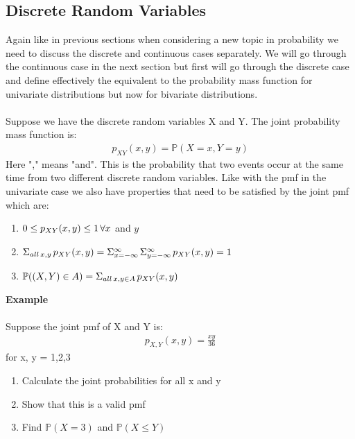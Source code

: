\documentclass[,oneside]{article}
\begin{document}
\begin{enumerate}
\subsection{Discrete Random Variables}
Again like in previous sections when considering a new topic in probability we need to discuss the discrete and continuous cases separately. We will go through the continuous case in the next section but first will go through the discrete case and define effectively the equivalent to the probability mass function for univariate distributions but now for bivariate distributions. \\ \\
Suppose we have the discrete random variables X and Y. The joint probability mass function is:
\begin{align*}
p_{XY}(x,y) = \mathbb{P}(X = x, Y = y)
\end{align*}
Here "," means "and". This is the probability that two events occur at the same time from two different discrete random variables. Like with the pmf in the univariate case we also have properties that need to be satisfied by the joint pmf which are:
\begin{enumerate}
\item $0 \leq p_{XY}(x,y) \leq 1\hspace{0.05cm}\forall x$ and $y$
\item $\Sigma_{all \hspace{0.05cm}x,y}\hspace{0.05cm} p_{XY}(x,y) = \Sigma_{x=-\infty}^{\infty} \hspace{0.05cm}\Sigma_{y=-\infty}^{\infty}\hspace{0.05cm}p_{XY}(x,y) = 1$
\item $\mathbb{P}((X, Y) \in A) = \Sigma_{all\hspace{0.05cm} x,y \in A}\hspace{0.05cm}p_{XY}(x,y)$
\end{enumerate}
\textbf{Example}\\ \\
Suppose the joint pmf of X and Y is:
\begin{align*}
p_{X,Y}(x,y) = \frac{xy}{36}
\end{align*}
for x, y = 1,2,3
\begin{enumerate}
\item Calculate the joint probabilities for all x and y
\item Show that this is a valid pmf
\item Find $\mathbb{P}(X = 3)$ and $\mathbb{P}(X \leq Y)$

\end{enumerate}
\end{enumerate}
\end{document}
